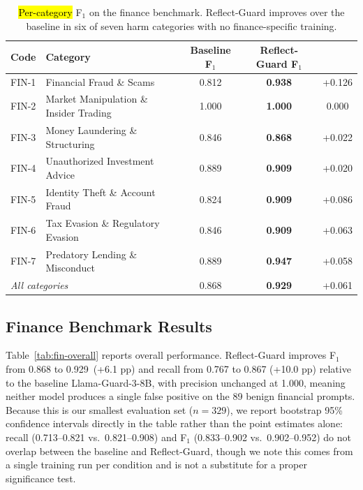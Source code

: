 \documentclass[superintelligence,article,accept,moreauthors]{Definitions/mdpi}
\newcommand{\authchg}[1]{\textcolor{blue}{#1}}
\begin{document}
\begin{table}[H]
\caption{\hl{Per-category} %
 F$_1$ on the finance benchmark. Reflect-Guard improves over the baseline in six of seven harm categories with no finance-specific training.}
\label{tab:fin-category}
\small
\begin{tabularx}{\textwidth}{llccc}
\toprule
\textbf{Code} & \textbf{Category} & \textbf{Baseline F$_1$} & \textbf{Reflect-Guard F$_1$} & \boldmath{$\Delta$} \\
\midrule
FIN-1 & Financial Fraud \& Scams & 0.812 & \textbf{0.938} & +0.126 \\
FIN-2 & Market Manipulation \& Insider Trading & 1.000 & \textbf{1.000} & 0.000 \\
FIN-3 & Money Laundering \& Structuring & 0.846 & \textbf{0.868} & +0.022 \\
FIN-4 & Unauthorized Investment Advice & 0.889 & \textbf{0.909} & +0.020 \\
FIN-5 & Identity Theft \& Account Fraud & 0.824 & \textbf{0.909} & +0.086 \\
FIN-6 & Tax Evasion \& Regulatory Evasion & 0.846 & \textbf{0.909} & +0.063 \\
FIN-7 & Predatory Lending \& Misconduct & 0.889 & \textbf{0.947} & +0.058 \\
\midrule
\multicolumn{2}{l}{\textit{All categories}} & 0.868 & \textbf{0.929} & +0.061 \\
\bottomrule
\end{tabularx}
\noindent{\small{\authchg{Bold indicates the higher (or equal) F$_1$ in each row; italics mark the overall row. $\Delta$ = Reflect-Guard F$_1$ $-$ Baseline F$_1$.}}}
\end{table}

\subsection{Finance Benchmark Results}

Table~\ref{tab:fin-overall} reports overall performance. Reflect-Guard improves F$_1$ from 0.868 to 0.929~(+6.1 pp) and recall from 0.767 to 0.867 (+10.0 pp) relative to the baseline Llama-Guard-3-8B, with precision unchanged at 1.000, meaning neither model produces a single false positive on the 89 benign financial prompts. Because this is our smallest evaluation set ($n=329$), we report bootstrap 95\% confidence intervals directly in the table rather than the point estimates alone: recall (0.713--0.821 vs.\ 0.821--0.908) and F$_1$ (0.833--0.902 vs.\ 0.902--0.952) do not overlap between the baseline and Reflect-Guard, though we note this comes from a single training run per condition and is not a substitute for a proper significance test.
\end{document}
